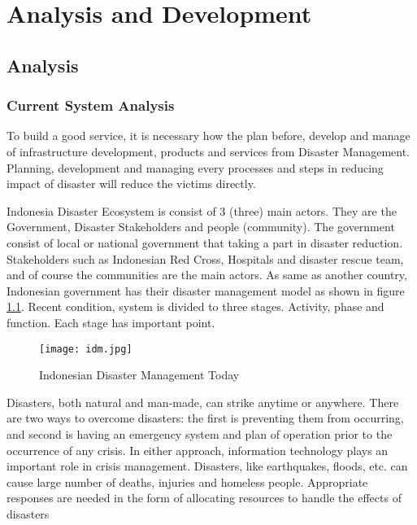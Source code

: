 \chapter{Analysis and Development}
\section{Analysis}
\vspace{-0.5cm}
\subsection{Current System Analysis}
\label{subsec:CurrentSystemAnalysis}
To build a good service, it is necessary how the plan before, develop and manage of infrastructure development, products and services from Disaster Management. Planning, development and managing every processes and steps in reducing impact of disaster will reduce the victims directly.\par 
Indonesia Disaster Ecosystem is consist of 3 (three) main actors. They are the Government, Disaster Stakeholders and people (community). The government consist of local or national government that taking a part in disaster reduction. Stakeholders such as Indonesian Red Cross, Hospitals and disaster rescue team, and of course the communities are the main actors. As same as another country, Indonesian government has their disaster management model as shown in figure \ref{fig:idm_figure}. Recent condition, system is divided to three stages. Activity, phase and function. Each stage has important point.\par 
\begin{figure}[H]
\begin{center}
\texttt{[image: idm.jpg]}
\caption{Indonesian Disaster Management Today \cite{Framework2013}}
\label{fig:idm_figure}
\end{center}
\end{figure}

Disasters, both natural and man-made, can strike anytime or anywhere. There are two ways to overcome disasters: the first is preventing them from occurring, and second is having an emergency system and plan of operation prior to the occurrence of any crisis. In either approach, information technology plays an important role in crisis management. Disasters, like earthquakes, floods, etc. can cause large number of deaths, injuries and homeless people. Appropriate responses are needed in the form of allocating resources to handle the effects of disasters\par

